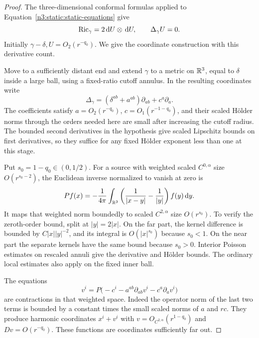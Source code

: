 \begin{proof}
The three-dimensional conformal formulas applied to
Equation~\eqref{n3:static:static-equations} give
\begin{equation}
\label{n3:static:gamma-equations}
\operatorname{Ric}_\gamma=2\,\mathrm d U\otimes\,\mathrm d U,\qquad \Delta_\gamma U=0.
\end{equation}
Initially \(\gamma-\delta,U=O_2(r^{-q_0})\).
We give the coordinate construction with this derivative count.

Move to a sufficiently distant end and extend \(\gamma\) to a
metric on \(\mathbb R^3\), equal to \(\delta\) inside a large ball,
using a fixed-ratio cutoff annulus.
In the resulting coordinates write
\[
\Delta_\gamma=(\delta^{ab}+a^{ab})\partial_{ab}+c^a\partial_a .
\]
The coefficients satisfy \(a=O_2(r^{-q_0})\),
\(c=O_1(r^{-1-q_0})\), and their scaled Hölder norms through
the orders needed here are small after increasing the cutoff radius.
The bounded second derivatives in the hypothesis give scaled
Lipschitz bounds on first derivatives, so they suffice for any fixed
Hölder exponent less than one at this stage.

Put \(s_0=1-q_0\in(0,1/2)\).
For a source with weighted scaled \(C^{0,\alpha}\) size
\(O(r^{s_0-2})\), the Euclidean inverse normalized to vanish at zero is
\begin{equation}
\label{n3:static:subtracted-newton}
Pf(x)=-\frac1{4\pi}\int_{\mathbb R^3}
\left(\frac1{|x-y|}-\frac1{|y|}\right)f(y)\,\mathrm d y.
\end{equation}
It maps that weighted norm boundedly to scaled
\(C^{2,\alpha}\) size \(O(r^{s_0})\).
To verify the zeroth-order bound, split at \(|y|=2|x|\).
On the far part, the kernel difference is bounded by
\(C|x||y|^{-2}\), and its integral is \(O(|x|^{s_0})\)
because \(s_0<1\).
On the near part the separate kernels have the same bound because
\(s_0>0\).
Interior Poisson estimates on rescaled annuli give the derivative
and Hölder bounds.
The ordinary local estimates also apply on the fixed inner ball.

The equations
\[
v^i=P\bigl(-c^i-a^{ab}\partial_{ab}v^i-c^a\partial_av^i\bigr)
\]
are contractions in that weighted space.
Indeed the operator norm of the last two terms is bounded by a
constant times the small scaled norms of \(a\) and \(rc\).
They produce harmonic coordinates \(x^i+v^i\) with
\(v=O_{C^{2,\alpha}}(r^{1-q_0})\) and
\(Dv=O(r^{-q_0})\).
These functions are coordinates sufficiently far out.


\end{proof}
